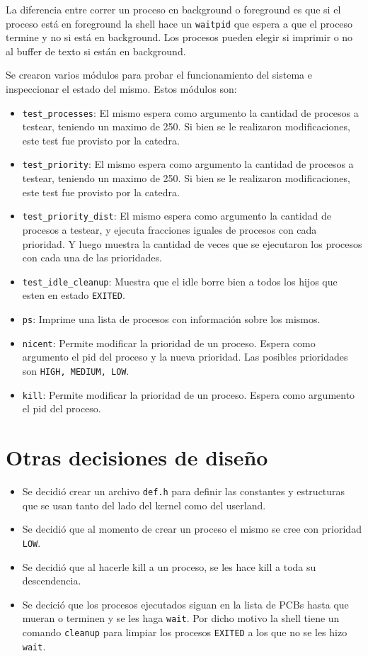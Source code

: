 \documentclass{article}
\begin{document}
La diferencia entre correr un proceso en background o foreground es que si el proceso está en foreground la shell hace un \texttt{waitpid} que espera a que el proceso termine y no si está en background. Los procesos pueden elegir si imprimir o no al buffer de texto si están en background.

Se crearon varios módulos para probar el funcionamiento del sistema e inspeccionar el estado del mismo. Estos módulos son:
\begin{itemize}
    \item \texttt{test\_processes}: El mismo espera como argumento la cantidad de procesos a testear, teniendo un maximo de 250. Si bien se le realizaron modificaciones, este test fue provisto por la catedra.
    \item \texttt{test\_priority}: El mismo espera como argumento la cantidad de procesos a testear, teniendo un maximo de 250. Si bien se le realizaron modificaciones, este test fue provisto por la catedra.
    \item \texttt{test\_priority\_dist}: El mismo espera como argumento la cantidad de procesos a testear, y ejecuta fracciones iguales de procesos con cada prioridad. Y luego muestra la cantidad de veces que se ejecutaron los procesos con cada una de las prioridades.
    \item \texttt{test\_idle\_cleanup}: Muestra que el idle borre bien a todos los hijos que esten en estado \texttt{EXITED}.
    \item \texttt{ps}: Imprime una lista de procesos con información sobre los mismos.
    \item \texttt{nicent}: Permite modificar la prioridad de un proceso. Espera como argumento el pid del proceso y la nueva prioridad. Las posibles prioridades son \texttt{HIGH, MEDIUM, LOW}.
    \item \texttt{kill}: Permite modificar la prioridad de un proceso. Espera como argumento el pid del proceso.
\end{itemize}

\section {Otras decisiones de diseño}
\begin{itemize}
    \item Se decidió crear un archivo \texttt{\texttt{def.h}} para definir las constantes y estructuras que se usan tanto del lado del kernel como del userland.
    \item Se decidió que al momento de crear un proceso el mismo se cree con prioridad \texttt{LOW}.
    \item Se decidió que al hacerle kill a un proceso, se les hace kill a toda su descendencia.
    \item Se decició que los procesos ejecutados siguan en la lista de PCBs hasta que mueran o terminen y se les haga \texttt{wait}. Por dicho motivo la shell tiene un comando \texttt{cleanup} para limpiar los procesos \texttt{EXITED} a los que no se les hizo \texttt{wait}.
\end{itemize}
\end{document}

